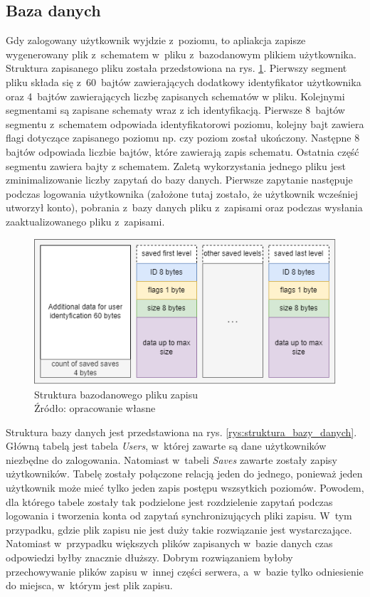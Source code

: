 \documentclass[12pt,a4paper]{article} %
\begin{document}
\subsection{Baza danych}
\aka Gdy zalogowany użytkownik wyjdzie z~poziomu, to apliakcja zapisze wygenerowany plik z~schematem w~pliku z~bazodanowym plikiem użytkownika. Struktura zapisanego pliku została przedstowiona na rys. \ref{rys:bazodanowy_plik_zapisu}. Pierwszy segment pliku składa się z~60~bajtów zawierających dodatkowy identyfikator użytkownika oraz 4~bajtów zawierających liczbę zapisanych schematów w pliku. Kolejnymi segmentami są zapisane schematy wraz z ich identyfikacją. Pierwsze 8~bajtów segmentu z~schematem odpowiada identyfikatorowi poziomu, kolejny bajt zawiera flagi dotyczące zapisanego poziomu np. czy poziom został ukończony. Następne 8 bajtów odpowiada liczbie bajtów, które zawierają zapis schematu. Ostatnia część segmentu zawiera bajty z schematem. Zaletą wykorzystania jednego pliku jest zminimalizowanie liczby zapytań do bazy danych. Pierwsze zapytanie następuje podczas logowania użytkownika (założone tutaj zostało, że użytkownik wcześniej utworzył konto), pobrania z~bazy danych pliku z~zapisami oraz podczas wysłania zaaktualizowanego pliku z~zapisami.

\begin{figure}[h]
	\centering
	\includegraphics[width=12cm]{images/database_save_file.png}
	\caption{Struktura bazodanowego pliku zapisu \\ Źródło: opracowanie własne}
	\label{rys:bazodanowy_plik_zapisu}
\end{figure} 

\aka Struktura bazy danych jest przedstawiona na rys. \ref{rys:struktura_bazy_danych}. Główną tabelą jest tabela \textit{Users}, w~której zawarte są dane użytkowników niezbędne do zalogowania. Natomiast w~tabeli \textit{Saves} zawarte zostały zapisy użytkowników. Tabelę zostały połączone relacją jeden do jednego, ponieważ jeden użytkownik może mieć tylko jeden zapis postępu wszsytkich poziomów. Powodem, dla którego tabele zostały tak podzielone jest rozdzielenie zapytań podczas logowania i tworzenia konta od zapytań synchronizujących pliki zapisu. W~tym przypadku, gdzie plik zapisu nie jest duży takie rozwiązanie jest wystarczające. Natomiast w~przypadku większych plików zapisanych w~bazie danych czas odpowiedzi byłby znacznie dłuższy. Dobrym rozwiązaniem byłoby przechowywanie plików zapisu w~innej części serwera, a~w~bazie tylko odniesienie do miejsca, w~którym jest plik zapisu.
\end{document}
